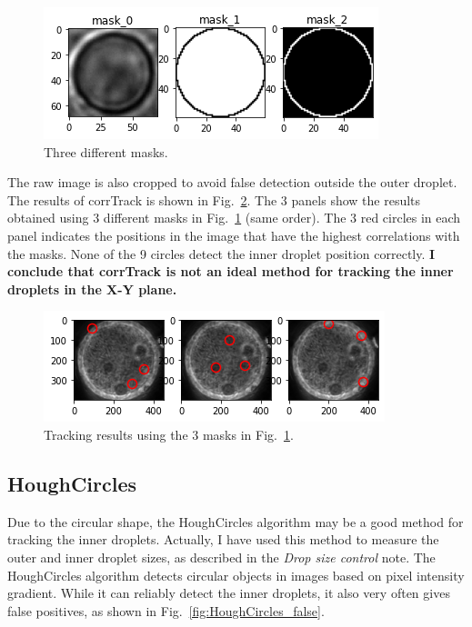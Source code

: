 \documentclass[onecolumn,aps, pre,amsmath,amssymb,longbibliography,11pt]{revtex4-2}
\begin{document}
\begin{figure}[h]
  \includegraphics{3-masks.png}
  \caption{Three different masks.}
  \label{fig:3-masks}
\end{figure}

The raw image is also cropped to avoid false detection outside the outer droplet.
The results of corrTrack is shown in Fig.~\ref{fig:3-mask-results}.
The 3 panels show the results obtained using 3 different masks in Fig.~\ref{fig:3-masks} (same order).
The 3 red circles in each panel indicates the positions in the image that have the highest correlations with the masks.
None of the 9 circles detect the inner droplet position correctly.
\textbf{I conclude that corrTrack is not an ideal method for tracking the inner droplets in the X-Y plane.}

\begin{figure}[h]
  \includegraphics{3-mask-results.png}
  \caption{Tracking results using the 3 masks in Fig.~\ref{fig:3-masks}.}
  \label{fig:3-mask-results}
\end{figure}

\subsection{HoughCircles}

Due to the circular shape, the HoughCircles algorithm may be a good method for tracking the inner droplets.
Actually, I have used this method to measure the outer and inner droplet sizes, as described in the \textit{Drop size control} note.
The HoughCircles algorithm detects circular objects in images based on pixel intensity gradient.
While it can reliably detect the inner droplets, it also very often gives false positives, as shown in Fig.~\ref{fig:HoughCircles_false}.
\end{document}
